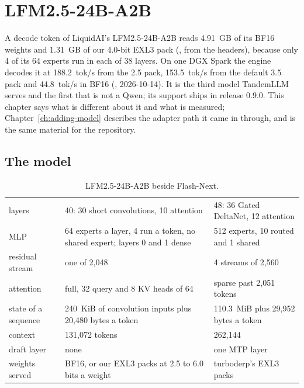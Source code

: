 \chapter{LFM2.5-24B-A2B}\label{ch:lfm25}

A decode token of LiquidAI's LFM2.5-24B-A2B reads 4.91~GB of its BF16 weights and 1.31~GB of our 4.0-bit EXL3 pack (\arith, from the headers), because only 4 of its 64 experts run in each of 38 layers. On one DGX Spark the engine decodes it at 188.2~tok/s from the 2.5 pack, 153.5~tok/s from the default 3.5 pack and 44.8~tok/s in BF16 (\measured, 2026-10-14). It is the third model TandemLLM serves and the first that is not a Qwen; its support ships in release 0.9.0. This chapter says what is different about it and what is measured; Chapter~\ref{ch:adding-model} describes the adapter path it came in through, and  is the same material for the repository.

\section{The model}

\begin{table}[htbp]
\centering\small
\caption{LFM2.5-24B-A2B beside Flash-Next.}\label{tab:lfm-model}
\begin{tabularx}{\linewidth}{@{}L{.2\linewidth}YL{.3\linewidth}@{}}
\toprule
{} &  &  \\
\midrule
layers & 40: 30 short convolutions, 10 attention & 48: 36 Gated DeltaNet, 12 attention \\
MLP & 64 experts a layer, 4 run a token, no shared expert; layers 0 and 1 dense & 512 experts, 10 routed and 1 shared \\
residual stream & one of 2,048 & 4 streams of 2,560 \\
attention & full, 32 query and 8 KV heads of 64 & sparse past 2,051 tokens \\
state of a sequence & 240~KiB of convolution inputs plus 20,480 bytes a token & 110.3~MiB plus 29,952 bytes a token \\
context & 131,072 tokens & 262,144 \\
draft layer & none & one MTP layer \\
weights served & BF16, or our EXL3 packs at 2.5 to 6.0 bits a weight & turboderp's EXL3 packs \\
\bottomrule
\end{tabularx}
\end{table}

